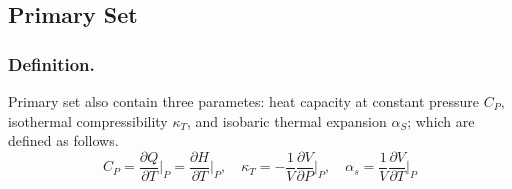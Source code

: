 \documentclass[../../../Main.tex]{subfiles}
\begin{document}
\subsection{Primary Set}
\subsubsection{Definition.} Primary set also contain three parametes: heat capacity at constant pressure $C_P$, isothermal compressibility $\kappa_T$, and isobaric thermal expansion $\alpha_S$; which are defined as follows.
\begin{equation*}
    C_P=\frac{\partial Q}{\partial T}\bigg|_P=\frac{\partial H}{\partial T}\bigg|_P,\quad 
    \kappa_T=-\frac{1}{V}\frac{\partial V}{\partial P}\bigg|_P,\quad
    \alpha_s=\frac{1}{V}\frac{\partial V}{\partial T}\bigg|_P
\end{equation*}
\end{document}
